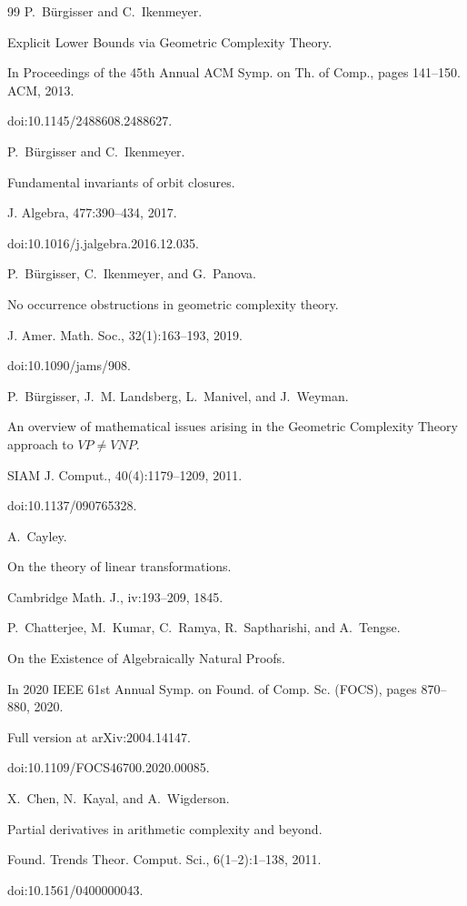 \begin{thebibliography}{99}
P. Bürgisser and C. Ikenmeyer.


Explicit Lower Bounds via Geometric Complexity Theory.


In Proceedings of the 45th Annual ACM Symp. on Th. of Comp.,
pages 141–150. ACM, 2013.


doi:10.1145/2488608.2488627.

P. Bürgisser and C. Ikenmeyer.


Fundamental invariants of orbit closures.


J. Algebra, 477:390–434, 2017.


doi:10.1016/j.jalgebra.2016.12.035.

P. Bürgisser, C. Ikenmeyer, and G. Panova.


No occurrence obstructions in geometric complexity theory.


J. Amer. Math. Soc., 32(1):163–193, 2019.


doi:10.1090/jams/908.

P. Bürgisser, J. M. Landsberg, L. Manivel, and J. Weyman.


An overview of mathematical issues arising in the Geometric
Complexity Theory approach to $VP\neq VNP$.


SIAM J. Comput., 40(4):1179–1209, 2011.


doi:10.1137/090765328.

A. Cayley.


On the theory of linear transformations.


Cambridge Math. J., iv:193–209, 1845.

P. Chatterjee, M. Kumar, C. Ramya, R. Saptharishi, and A. Tengse.


On the Existence of Algebraically Natural Proofs.


In 2020 IEEE 61st Annual Symp. on Found. of Comp. Sc. (FOCS),
pages 870–880, 2020.


Full version at arXiv:2004.14147.


doi:10.1109/FOCS46700.2020.00085.

X. Chen, N. Kayal, and A. Wigderson.


Partial derivatives in arithmetic complexity and beyond.


Found. Trends Theor. Comput. Sci., 6(1–2):1–138, 2011.


doi:10.1561/0400000043.


\end{thebibliography}
